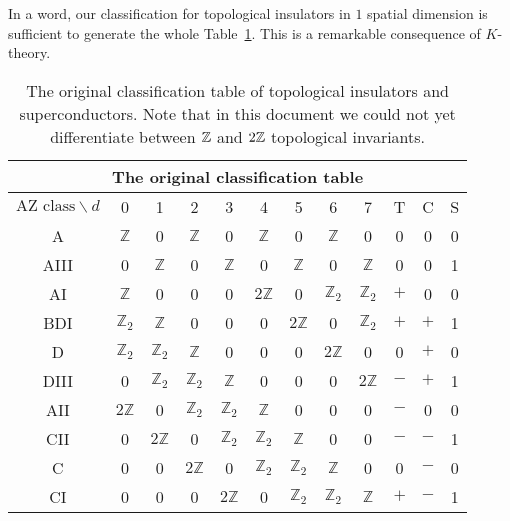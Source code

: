 In a word, our classification for topological insulators in $1$ spatial
dimension is sufficient to generate the whole Table~\ref{tab:master-table2}.
This is a remarkable consequence of $K$-theory.
\begin{table}
\begin{center}
\begin{tabular}{|c|cccccccc|ccc|}
\hline
\multicolumn{12}{|c|}{
The original classification table} \\ \hline
   $\mbox{AZ class} \backslash d$  & 0 & 1 & 2 & 3 & 4 & 5 & 6 & 7 & T & C & S  \\
\hline\hline
  A & $\mathbb{Z}$ & 0 & $\mathbb{Z}$ & 0 & $\mathbb{Z}$ & 0 & $\mathbb{Z}$ & 0             & 0 & 0 & 0    \\
  AIII & 0 & $\mathbb{Z}$ & 0 & $\mathbb{Z}$ & 0 & $\mathbb{Z}$ & 0 & $\mathbb{Z}$          & 0 & 0 & 1    \\  \hline

  AI & $\mathbb{Z}$ & 0 & 0 & 0 & $2\mathbb{Z}$ & 0 & $\mathbb{Z}_2$ & $\mathbb{Z}_2$    & $+$ & 0 & 0     \\
  BDI & $\mathbb{Z}_2$ & $\mathbb{Z}$ & 0 & 0 & 0 & $2\mathbb{Z}$ & 0 & $\mathbb{Z}_2$     & $+$ & $+$ & 1    \\
  D & $\mathbb{Z}_2$ & $\mathbb{Z}_2$ & $\mathbb{Z}$ & 0 & 0 & 0 & $2\mathbb{Z}$ & 0     & 0 & $+$ & 0     \\
  DIII & 0 & $\mathbb{Z}_2$ & $\mathbb{Z}_2$ & $\mathbb{Z}$ & 0 & 0 & 0 & $2\mathbb{Z}$  & $-$ & $+$ & 1     \\
  AII & $2\mathbb{Z}$ & 0 & $\mathbb{Z}_2$ & $\mathbb{Z}_2$ & $\mathbb{Z}$ & 0 & 0 & 0   & $-$ & 0 & 0     \\
  CII & 0 & $2\mathbb{Z}$ & 0 & $\mathbb{Z}_2$ & $\mathbb{Z}_2$ & $\mathbb{Z}$ & 0 & 0   & $-$ & $-$ & 1     \\
  C & 0 & 0 & $2\mathbb{Z}$ & 0 & $\mathbb{Z}_2$ & $\mathbb{Z}_2$ & $\mathbb{Z}$ & 0     & 0 & $-$ & 0     \\
  CI & 0 & 0 & 0 & $2\mathbb{Z}$ & 0 & $\mathbb{Z}_2$ & $\mathbb{Z}_2$ & $\mathbb{Z}$    & $+$ & $-$ & 1
   \\
\hline
\end{tabular}
\caption{The original classification table of topological insulators and
superconductors. Note that in this document we could not yet differentiate
between $\mathbb{Z}$ and $2\mathbb{Z}$ topological invariants.}
\label{tab:master-table2}
\end{center}
\end{table}
